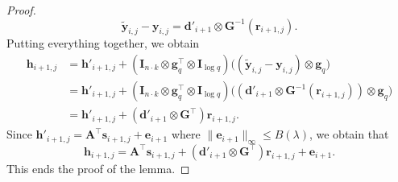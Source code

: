 \documentclass{article}
\renewcommand{\sec}{\ensuremath{\lambda}}
\newcommand{\id}{\ensuremath{\mathbf{I}}}
\begin{document}
\begin{proof}
\[ \tilde{\mathbf{y}}_{i,j}-\mathbf{y}_{i,j} =\mathbf{d}'_{i+1}\otimes \mathbf{G}^{-1}(\mathbf{r}_{i+1,j}). \]
Putting everything together, we obtain
\begin{align}
\mathbf{h}_{i+1,j}
&=\mathbf{h}'_{i+1,j}
+(\id_{n\cdot k}\otimes \mathbf g_q^\intercal\otimes \id_{\log q})\bigl((\tilde{\mathbf{y}}_{i,j}-\mathbf y_{i,j})\otimes \mathbf g_q\bigr)\nonumber\\
&=\mathbf{h}'_{i+1,j}
+(\id_{n\cdot k}\otimes \mathbf g_q^\intercal\otimes \id_{\log q})
\bigl((\mathbf d'_{i+1}\otimes \mathbf G^{-1}(\mathbf r_{i+1,j}))\otimes \mathbf g_q\bigr)\nonumber\\
&=\mathbf{h}'_{i+1,j}+(\mathbf d'_{i+1}\otimes \mathbf G^\intercal)\mathbf r_{i+1,j}.\label{eqclaimboh}
\end{align}
Since $\mathbf{h}'_{i+1,j}=\mathbf{A}^\intercal \mathbf{s}_{i+1,j}+\mathbf e_{i+1}$ where $\lVert \mathbf{e}_{i+1}\rVert_\infty\le B(\sec)$, we obtain that
\[ \mathbf{h}_{i+1,j}=\mathbf{A}^\intercal \mathbf{s}_{i+1,j}+(\mathbf{d}'_{i+1}\otimes \mathbf{G}^\intercal)\mathbf{r}_{i+1,j}+\mathbf e_{i+1}. \]
This ends the proof of the lemma.
\end{proof}
\end{document}
